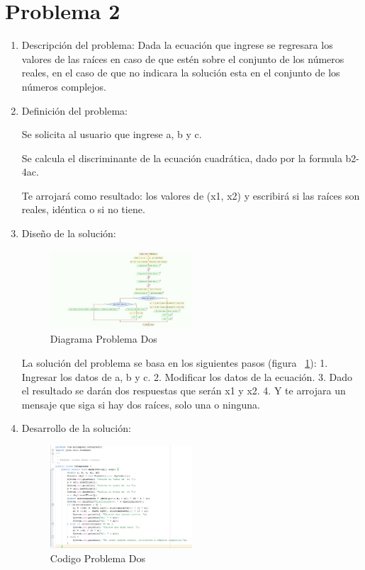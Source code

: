 \documentclass{IEEEcsmag}
\begin{document}
\section{Problema 2}
\setlength{\parskip}{5pt}
\begin{enumerate}
\item Descripción del problema:
Dada la ecuación que ingrese se regresara los valores de las raíces en caso de que estén sobre el conjunto de los números reales, en el caso de que no indicara la solución esta en el conjunto de los números complejos.\newline

\item Definición del problema:
	
 Se solicita al usuario que ingrese a, b y c.
	
 Se calcula el discriminante de la ecuación cuadrática, dado por la formula b2-4ac.
	
 Te arrojará como resultado: los valores de (x1, x2) y escribirá si las raíces son reales, idéntica o si no tiene.\newline

 \item Diseño de la solución:
  
\begin{figure}
\caption{Diagrama Problema Dos}
\centerline{\includegraphics[width=0.5\textwidth]{./latex-imagenes/diagramaProb2.jpg}}
\vspace*{7pt}
\label{fig:diagramaP2}
\end{figure}

 La solución del problema se basa en los siguientes pasos (figura ~\ref{fig:diagramaP2}):
1.	Ingresar los datos de a, b y c.
2.	Modificar los datos de la ecuación.
3.	Dado el resultado se darán dos respuestas que serán x1 y x2.
4.	Y te arrojara un mensaje que siga si hay dos raíces, solo una o ninguna.\newline

\item Desarrollo de la solución:

\begin{figure}
\caption{Codigo Problema Dos}
\centerline{\includegraphics[width=0.5\textwidth]{./latex-imagenes/codigoprob2.jpg}}
\vspace*{7pt}
\label{fig:codigoP2}
\end{figure}


\end{enumerate}
\end{document}
